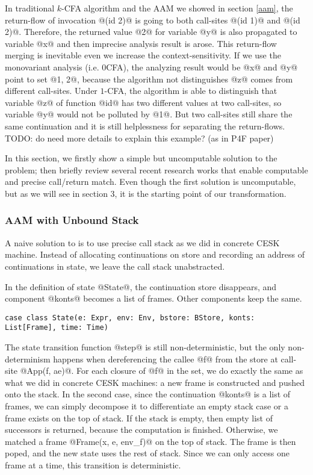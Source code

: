 \documentclass[acmsmall,review,anonymous]{acmart}\settopmatter{printfolios=true,printccs=false,printacmref=false}
\begin{document}
In traditional $k$-CFA algorithm and the AAM we showed in section \ref{aam}, 
the return-flow of invocation @(id 2)@
is going to both call-sites @(id 1)@ and @(id 2)@. Therefore, the
returned value @2@ for variable @y@ is also propagated to 
variable @x@ and then imprecise analysis result is arose.
This return-flow merging is inevitable even we increase the context-sensitivity.
If we use the monovariant analysis (i.e. 0CFA), the analyzing result would be @x@ and 
@y@ point to set @{1, 2}@, because the algorithm not distinguishes
@z@ comes from different call-sites.
Under $1$-CFA, the algorithm is able to distinguish that variable @z@ of function
@id@ has two different values at two call-sites, so variable @y@ 
would not be polluted by @1@. 
But two call-sites still share the same continuation and
it is still helplessness for separating the return-flows.
TODO: do need more details to explain this example? (as in P4F paper)

In this section, we firstly show a simple but uncomputable solution to the
problem; then briefly review several recent research works that enable
computable and precise call/return match. Even though the first solution is
uncomputable, but as we will see in section 3, it is the starting point of our
transformation. 

\subsubsection{AAM with Unbound Stack}

A naive solution to is to use precise call stack as we did in concrete
CESK machine. Instead of allocating continuations on store and recording an 
address of continuations in state, we leave the call stack unabstracted. 

In the definition of state @State@, the continuation store disappears, and
component @konts@ becomes a list of frames. Other components keep the same.

\begin{lstlisting}
case class State(e: Expr, env: Env, bstore: BStore, konts: List[Frame], time: Time)
\end{lstlisting}

The state transition function @step@ is still non-deterministic, but
the only non-determinism happens when dereferencing the callee @f@ 
from the store at call-site @App(f, ae)@. 
For each closure of @f@ in the set, we do exactly
the same as what we did in concrete CESK machines: a new frame is constructed
and pushed onto the stack.
In the second case, since the continuation @konts@ is a list of 
frames, we can simply decompose it to differentiate an empty stack case
or a frame exists on the top of stack. 
If the stack is empty, then empty list of successors is returned, 
because the computation is finished.
Otherwise, we matched a frame @Frame(x, e, env_f)@ on the top of stack.
The frame is then poped, and the new state uses the rest of stack.
Since we can only access one frame at a time, this transition is deterministic.
\end{document}
